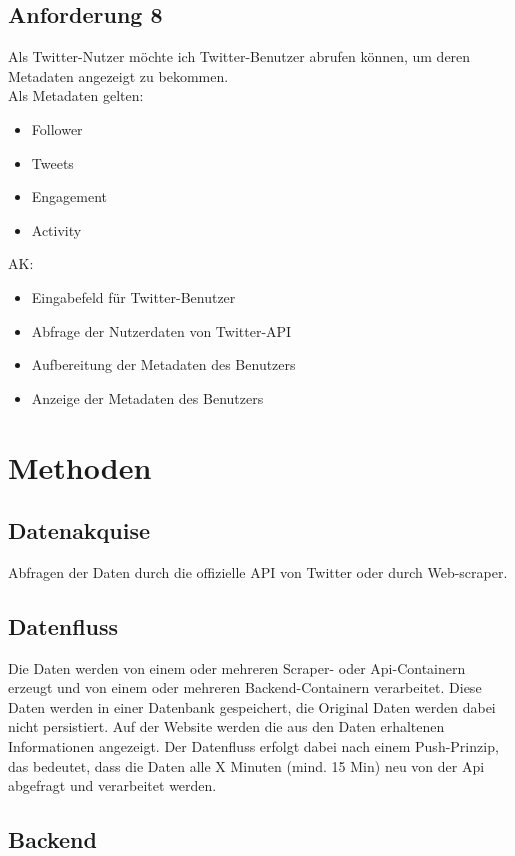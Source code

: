 \documentclass[conference]{IEEEtran}
\begin{document}
\subsection{Anforderung 8}
Als Twitter-Nutzer möchte ich Twitter-Benutzer abrufen können,
um deren Metadaten angezeigt zu bekommen.
\\
Als Metadaten gelten:
\begin{itemize}
        \item Follower
        \item Tweets
        \item Engagement
        \item Activity
\end{itemize}
AK:
\begin{itemize}
        \item Eingabefeld für Twitter-Benutzer
        \item Abfrage der Nutzerdaten von Twitter-API
        \item Aufbereitung der Metadaten des Benutzers
        \item Anzeige der Metadaten des Benutzers
\end{itemize}


\section{Methoden}

\subsection*{Datenakquise}

Abfragen der Daten durch die offizielle API von Twitter oder durch Web-scraper.

\subsection*{Datenfluss}
Die Daten werden von einem oder mehreren Scraper- oder Api-Containern erzeugt und von einem oder mehreren Backend-Containern verarbeitet.
Diese Daten werden in einer Datenbank gespeichert, die Original Daten werden dabei nicht persistiert.
Auf der Website werden die aus den Daten erhaltenen Informationen angezeigt.
Der Datenfluss erfolgt dabei nach einem Push-Prinzip, das bedeutet, dass die Daten alle X Minuten (mind. 15 Min) neu von der Api abgefragt und verarbeitet werden.

\subsection*{Backend}
\end{document}
